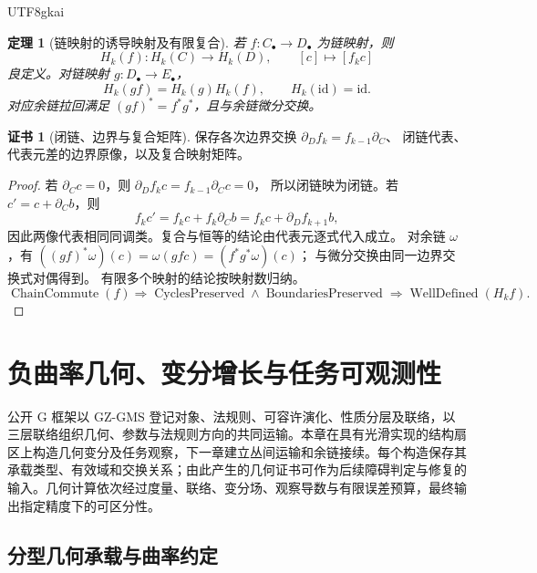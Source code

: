 \documentclass[12pt,a4paper,openany,notitlepage]{report}
\theoremstyle{plain}
\newtheorem{theorem}{定理}[chapter]
\theoremstyle{definition}
\newtheorem*{certificate}{证书}
\theoremstyle{remark}
\begin{document}
\begin{CJK*}{UTF8}{gkai}
\begin{theorem}[链映射的诱导映射及有限复合]
\label{exp:task:homology-functor}
若 $f:C_\bullet\to D_\bullet$ 为链映射，则
\[
 H_k(f):H_k(C)\to H_k(D),\qquad [c]\mapsto[f_kc]
\]
良定义。对链映射 $g:D_\bullet\to E_\bullet$，
\[
 H_k(gf)=H_k(g)H_k(f),\qquad H_k(\mathrm{id})=\mathrm{id}.
\]
对应余链拉回满足 $(gf)^*=f^*g^*$，且与余链微分交换。
\end{theorem}
\begin{certificate}[闭链、边界与复合矩阵]
保存各次边界交换 $\partial_Df_k=f_{k-1}\partial_C$、
闭链代表、代表元差的边界原像，以及复合映射矩阵。
\end{certificate}
\begin{proof}
若 $\partial_Cc=0$，则 $\partial_Df_kc=f_{k-1}\partial_Cc=0$，
所以闭链映为闭链。若 $c'=c+\partial_Cb$，则
\[
 f_kc'=f_kc+f_k\partial_Cb
 =f_kc+\partial_Df_{k+1}b,
\]
因此两像代表相同同调类。复合与恒等的结论由代表元逐式代入成立。
对余链 $\omega$，有
$((gf)^*\omega)(c)=\omega(gfc)=(f^*g^*\omega)(c)$；
与微分交换由同一边界交换式对偶得到。
有限多个映射的结论按映射数归纳。
\[
 \operatorname{ChainCommute}(f)
 \Rightarrow\operatorname{CyclesPreserved}\land\operatorname{BoundariesPreserved}
 \Rightarrow\operatorname{WellDefined}(H_kf).
\]
\end{proof}


\chapter{负曲率几何、变分增长与任务可观测性}
\label{exp:ch:geometry}

\label{hgov:geo:section}

公开 G 框架以 GZ-GMS 登记对象、法规则、可容许演化、性质分层及联络，以三层联络组织几何、参数与法规则方向的共同运输\cite{S01,GFrameworkSynthesis}。本章在具有光滑实现的结构扇区上构造几何变分及任务观察，下一章建立丛间运输和余链接续。每个构造保存其承载类型、有效域和交换关系；由此产生的几何证书可作为后续障碍判定与修复的输入。几何计算依次经过度量、联络、变分场、观察导数与有限误差预算，最终输出指定精度下的可区分性。

\section{分型几何承载与曲率约定}
\label{hgov:geo:typed}


\end{CJK*}
\end{document}
